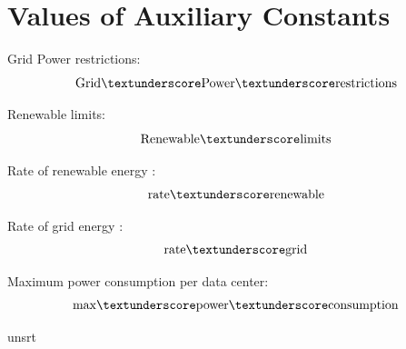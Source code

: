 \documentclass[12pt]{article}
\begin{document}
\section{Values of Auxiliary Constants}
Grid Power restrictions:
\begin{equation}
\mathrm{Grid\textunderscore Power\textunderscore restrictions}
\end{equation}

Renewable limits:
\begin{equation}
\mathrm{Renewable\textunderscore limits}
\end{equation}

Rate of renewable energy :
\begin{equation}
\mathrm{rate\textunderscore renewable}
\end{equation}

Rate of grid energy :
\begin{equation}
\mathrm{rate\textunderscore grid}
\end{equation}

Maximum power consumption per data center:
\begin{equation}
\mathrm{max\textunderscore power\textunderscore consumption}
\end{equation}


 {unsrt}

\end{document}

